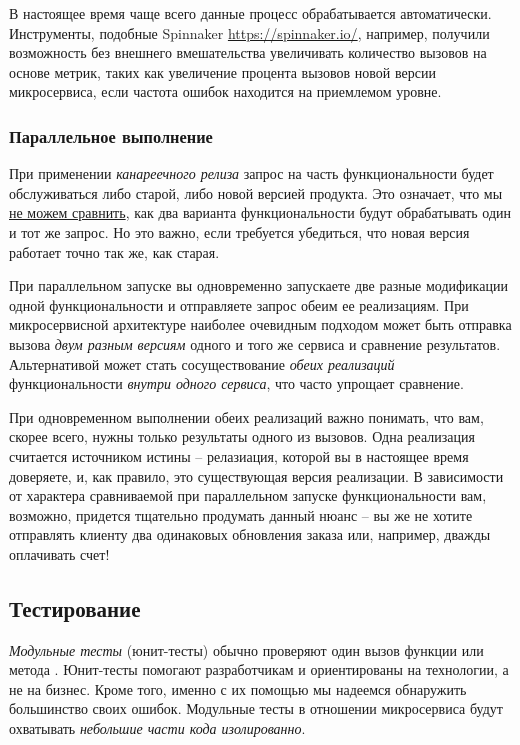 \documentclass[%
	11pt,
	a4paper,
	utf8,
		]{article}
\begin{document}
В настоящее время чаще всего данные процесс обрабатывается автоматически. Инструменты, подобные Spinnaker \url{https://spinnaker.io/}, например, получили возможность без внешнего вмешательства увеличивать количество вызовов на основе метрик, таких как увеличение процента вызовов новой версии микросервиса, если частота ошибок находится на приемлемом уровне.

\subsubsection{Параллельное выполнение}

При применении \emph{канареечного релиза} запрос на часть функциональности будет обслуживаться либо старой, либо новой версией продукта. Это означает, что мы \underline{не можем сравнить}, как два варианта функциональности будут обрабатывать один и тот же запрос. Но это важно, если требуется убедиться, что новая версия работает точно так же, как старая.

При параллельном запуске вы одновременно запускаете две разные модификации одной функциональности и отправляете запрос обеим ее реализациям. При микросервисной архитектуре наиболее очевидным подходом может быть отправка вызова \emph{двум разным версиям} одного и того же сервиса и сравнение результатов. Альтернативой может стать сосуществование \emph{обеих реализаций} функциональности \emph{внутри одного сервиса}, что часто упрощает сравнение.

При одновременном выполнении обеих реализаций важно понимать, что вам, скорее всего, нужны только результаты одного из вызовов. Одна реализация считается источником истины -- релазиация, которой вы в настоящее время доверяете, и, как правило, это существующая версия реализации. В зависимости от характера сравниваемой при параллельном запуске функциональности вам, возможно, придется тщательно продумать данный нюанс -- вы же не хотите отправлять клиенту два одинаковых обновления заказа или, например, дважды оплачивать счет!

\subsection{Тестирование}

\emph{Модульные тесты} (юнит-тесты) обычно проверяют один вызов функции или метода \cite[]{microservices-2024}. Юнит-тесты помогают разработчикам и ориентированы на технологии, а не на бизнес. Кроме того, именно с их помощью мы надеемся обнаружить большинство своих ошибок. Модульные тесты в отношении микросервиса будут охватывать \emph{небольшие части кода изолированно}.
\end{document}
